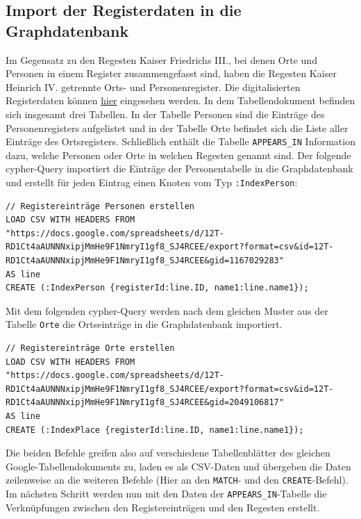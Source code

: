\documentclass[ngerman,]{scrreprt}
\begin{document}
\hypertarget{import-der-registerdaten-in-die-graphdatenbank-1}{%
\subsection{Import der Registerdaten in die Graphdatenbank}\label{import-der-registerdaten-in-die-graphdatenbank-1}}

Im Gegensatz zu den Regesten Kaiser Friedrichs III., bei denen Orte und Personen in einem Register zusammengefasst sind, haben die Regesten Kaiser Heinrich IV. getrennte Orts- und Personenregister. Die digitalisierten Registerdaten können \href{https://docs.google.com/spreadsheets/d/12T-RD1Ct4aAUNNNxipjMmHe9F1NmryI1gf8_SJ4RCEE/edit?usp=sharing}{hier} eingesehen werden. In dem Tabellendokument befinden sich insgesamt drei Tabellen. In der Tabelle Personen sind die Einträge des Personenregisters aufgelistet und in der Tabelle Orte befindet sich die Liste aller Einträge des Ortsregisters. Schließlich enthält die Tabelle \texttt{APPEARS\_IN} Information dazu, welche Personen oder Orte in welchen Regesten genannt sind. Der folgende cypher-Query importiert die Einträge der Personentabelle in die Graphdatenbank und erstellt für jeden Eintrag einen Knoten vom Typ \texttt{:IndexPerson}:

\begin{verbatim}
// Registereinträge Personen erstellen
LOAD CSV WITH HEADERS FROM "https://docs.google.com/spreadsheets/d/12T-RD1Ct4aAUNNNxipjMmHe9F1NmryI1gf8_SJ4RCEE/export?format=csv&id=12T-RD1Ct4aAUNNNxipjMmHe9F1NmryI1gf8_SJ4RCEE&gid=1167029283"
AS line
CREATE (:IndexPerson {registerId:line.ID, name1:line.name1});
\end{verbatim}

Mit dem folgenden cypher-Query werden nach dem gleichen Muster aus der Tabelle \texttt{Orte} die Ortseinträge in die Graphdatenbank importiert.

\begin{verbatim}
// Registereinträge Orte erstellen
LOAD CSV WITH HEADERS FROM "https://docs.google.com/spreadsheets/d/12T-RD1Ct4aAUNNNxipjMmHe9F1NmryI1gf8_SJ4RCEE/export?format=csv&id=12T-RD1Ct4aAUNNNxipjMmHe9F1NmryI1gf8_SJ4RCEE&gid=2049106817"
AS line
CREATE (:IndexPlace {registerId:line.ID, name1:line.name1});
\end{verbatim}

Die beiden Befehle greifen also auf verschiedene Tabellenblätter des gleichen Google-Tabellendokuments zu, laden es als CSV-Daten und übergeben die Daten zeilenweise an die weiteren Befehle (Hier an den \texttt{MATCH}- und den \texttt{CREATE}-Befehl). Im nächsten Schritt werden nun mit den Daten der \texttt{APPEARS\_IN}-Tabelle die Verknüpfungen zwischen den Registereinträgen und den Regesten erstellt.
\end{document}
